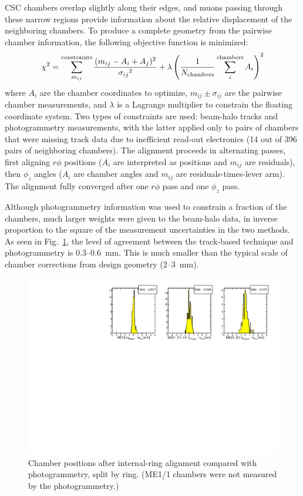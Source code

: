\documentclass[12pt]{article}
\newcommand{\s}[1]{{\mbox{\scriptsize #1}}}
\begin{document}
CSC chambers overlap slightly along their edges, and muons passing
through these narrow regions provide information about the relative
displacement of the neighboring chambers.  To produce a complete
geometry from the pairwise chamber information, the following
objective function is minimized:
\begin{equation}
\chi^2 = \sum_{m_{ij}}^\s{constraints} \frac{(m_{ij} - A_i +
  A_j)^2}{{\sigma_{ij}}^2} + \lambda \left(\frac{1}{N_\s{chambers}} \sum_i^\s{chambers}A_i\right)^2
\label{eqn:minimizeme}
\end{equation}
where $A_i$ are the chamber coordinates to optimize, $m_{ij} \pm
\sigma_{ij}$ are the pairwise chamber measurements, and $\lambda$ is a
Lagrange multiplier to constrain the floating coordinate system.  Two
types of constraints are used: beam-halo tracks and photogrammetry
measurements, with the latter applied only to pairs of chambers that
were missing track data due to inefficient read-out electronics (14
out of 396 pairs of neighboring chambers).  The alignment proceeds in
alternating passes, first aligning $r\phi$ positions ($A_i$ are
interpreted as positions and $m_{ij}$ are residuals), then $\phi_z$
angles ($A_i$ are chamber angles and $m_{ij}$ are
residuals-times-lever arm).  The alignment fully converged after one
$r\phi$ pass and one $\phi_z$ pass.

Although photogrammetry information was used to constrain a fraction
of the chambers, much larger weights were given to the beam-halo data,
in inverse proportion to the square of the measurement uncertainties
in the two methods.  As seen in Fig.~\ref{fig:aligned_minus_pg}, the
level of agreement between the track-based technique and
photogrammetry is 0.3--0.6~mm.  This is much smaller than the typical
scale of chamber corrections from design geometry (2--3~mm).

\begin{figure}
\includegraphics[width=\linewidth]{aligned_minus_pg.pdf}

\caption{Chamber positions after internal-ring alignment compared
  with photogrammetry, split by ring.  (ME1/1 chambers were not
  measured by the photogrammetry.) \label{fig:aligned_minus_pg}}
\end{figure}
\end{document}
